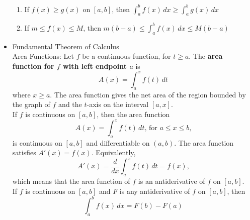 \documentclass{article}
\begin{document}
\begin{itemize}
\begin{enumerate}
        \item If $f(x) \geq g(x)$ on $[a,b]$, then $\int_a^b{f(x)\,dx} \geq \int_a^b{g(x)\,dx}$
        \item If $m \leq f(x) \leq M$, then $m(b - a) \leq \int_a^b{f(x)\,dx} \leq M(b - a)$
    \end{enumerate}
    \item Fundamental Theorem of Calculus \\
        Area Functions: Let $f$ be a continuous function, for $t \geq a$. The \textbf{area function for $f$ with left endpoint $a$} is
        $$A(x) = \int_a^x{f(t)\,dt}$$
        where $x \geq a$. The area function gives the net area of the region bounded by the graph of $f$ and the $t$-axis on the interval $[a,x]$. \\
        If $f$ is continuous on $[a,b]$, then the area function
        $$A(x) = \int_a^x{f(t)\,dt}\text{, for } a \leq x \leq b\text{,}$$
        is continuous on $[a,b]$ and differentiable on $(a,b)$. The area function satisfies $A'(x) = f(x)$. Equivalently,
        $$A'(x) = \frac{d}{dx}\int_a^x{f(t)\,dt} = f(x)\text{,}$$
        which means that the area function of $f$ is an antiderivative of $f$ on $[a,b]$. \\
        If $f$ is continuous on $[a,b]$ and $F$ is any antiderivative of $f$ on $[a,b]$, then
        $$\int_a^b{f(x)\,dx} = F(b) - F(a)$$
\end{itemize}
\end{document}
